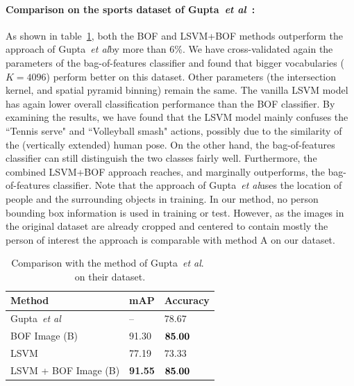 \documentclass{bmvc2k}
\def\etal{\emph{et al}\bmvaOneDot}
\newcommand{\cfs}{\small}   %
\begin{document}
\paragraph{Comparison on the sports dataset of Gupta~\etal~\cite{Gupta09}:}
As shown in table~\ref{tab:gupta}, both the BOF and LSVM+BOF methods
outperform the approach of Gupta~\etal by more than 6\%. We have
cross-validated again the parameters of the bag-of-features classifier
and found that  bigger vocabularies ($K=4096$) perform better on this
dataset. Other parameters (the intersection kernel, and spatial
pyramid binning) remain the same.
The vanilla LSVM model has again lower overall classification
performance than the BOF classifier.
By examining the results, we have found that the LSVM model mainly
confuses the ``Tennis serve" and ``Volleyball smash" actions, possibly
due to the similarity of the (vertically extended) human pose. On the
other hand, the bag-of-features classifier can still distinguish the
two classes fairly well. Furthermore, the combined LSVM+BOF approach
reaches, and marginally outperforms, the bag-of-features classifier.
Note that the approach of Gupta~\etal uses the location of people and
the surrounding objects in training.
In our method, no person bounding box information is used in training
or test. However, as the images in the original dataset
are already cropped and centered to contain mostly the person of
interest the approach is comparable with method A on our dataset.


\begin{table}[t]
\centering
{}
\begin{tabular}{|l||l|l|}
\hline
Method  				  	 & mAP	& Accuracy  \\ \hline 
Gupta~\etal~~\cite{Gupta09}	 & --	          &  $78.67$ \\ \hline 
BOF Image (B) 		 	          &  91.30 	 & ${\bf 85.00} $ \\ \hline 
LSVM 			  		 & 77.19	 & $ 73.33 $ \\ \hline 
LSVM + BOF Image (B)		 & {\bf 91.55}     & $ {\bf 85.00} $ \\ \hline 
\end{tabular}
\caption{\cfs Comparison with the method of Gupta~\etal.~\cite{Gupta09} on their dataset. \normalsize}
\label{tab:gupta}
\end{table}

\end{document}
